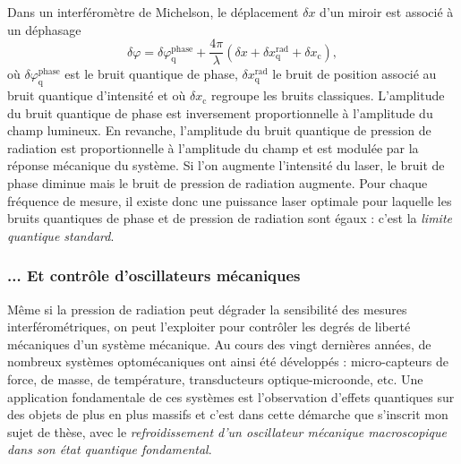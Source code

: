 \documentclass[12pt,a4paper]{article}
\begin{document}
Dans un interféromètre de Michelson, le déplacement $\delta x$ d'un miroir est associé à un déphasage
\begin{equation}
\delta \varphi = \delta \varphi ^\mathrm{phase} _\mathrm{q} + \frac{4\pi}{\lambda} ( \delta x + \delta x ^\mathrm{rad} _\mathrm{q} + \delta x_\mathrm{c}),
\label{eq:disp}
\end{equation}
où $\delta \varphi ^\mathrm{phase} _\mathrm{q}$ est le bruit quantique de phase, $\delta x ^\mathrm{rad} _\mathrm{q}$ le bruit de position associé au bruit quantique d'intensité et où $\delta x_\mathrm{c}$ regroupe les bruits classiques.
L'amplitude du bruit quantique de phase est inversement proportionnelle à l'amplitude du champ lumineux.
En revanche, l'amplitude du bruit quantique de pression de radiation est proportionnelle à l'amplitude du champ et est modulée par la réponse mécanique du système.
Si l'on augmente l'intensité du laser, le bruit de phase diminue mais le bruit de pression de radiation augmente.
Pour chaque fréquence de mesure, il existe donc une puissance laser optimale pour laquelle les bruits quantiques de phase et de pression de radiation sont égaux : c'est la \textit{limite quantique standard}.

\subsubsection{... Et contrôle d'oscillateurs mécaniques}

Même si la pression de radiation peut dégrader la sensibilité des mesures interférométriques, on peut l'exploiter pour contrôler les degrés de liberté mécaniques d'un système mécanique.
Au cours des vingt dernières années, de nombreux systèmes optomécaniques ont ainsi été développés : micro-capteurs de force, de masse, de température, transducteurs optique-microonde, etc.
Une application fondamentale de ces systèmes est l'observation d'effets quantiques sur des objets de plus en plus massifs et c'est dans cette démarche que s'inscrit mon sujet de thèse, avec le \textit{refroidissement d'un oscillateur mécanique macroscopique dans son état quantique fondamental}.
\end{document}
